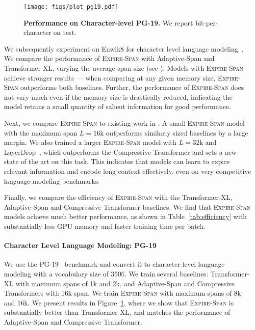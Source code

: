 \begin{figure}
    \centering
    \texttt{[image: figs/plot\_pg19.pdf]}
    \caption{\textbf{Performance on Character-level PG-19.}  We report bit-per-character on test.}
    \label{fig:pg19}
\end{figure}

We subsequently experiment on Enwik8 for character level language modeling~\citep{mahoney2011large}.  
We compare the performance of \textsc{Expire-Span} with Adaptive-Span and Transformer-XL, varying the average span size (see ). Models with \textsc{Expire-Span} achieve stronger results --- when comparing at any given memory size, \textsc{Expire-Span} outperforms both baselines. Further, the performance of \textsc{Expire-Span} does not vary much even if the memory size is drastically reduced, indicating the model retains a small quantity of salient information for good performance.

Next, we compare \textsc{Expire-Span} to existing work in . A small \textsc{Expire-Span} model with the maximum span $L=16\text{k}$ outperforms similarly sized baselines by a large margin.
We also trained a larger \textsc{Expire-Span} model with $L=32\text{k}$ and LayerDrop~\cite{Fan2020Reducing}, which outperforms the Compressive Transformer and sets a new state of the art on this task. 
This indicates that models can learn to expire relevant information and encode long context effectively, even on very competitive language modeling benchmarks.

Finally, we compare the efficiency of \textsc{Expire-Span} with the Transformer-XL, Adaptive-Span and Compressive Transformer baselines. 
We find that \textsc{Expire-Span} models achieve much better performance, as shown in Table~\ref{tab:efficiency} with substantially less GPU memory and faster training time per batch. 


\paragraph{Character Level Language Modeling: PG-19} 

We use the PG-19~\citep{rae2020compressive} benchmark and convert it to character-level language modeling with a vocabulary size of 3506.
We train several baselines: Transformer-XL with maximum spans of 1k and 2k, and Adaptive-Span and Compressive Transformers with 16k span.
We train \textsc{Expire-Span} with maximum spans of 8k and 16k.
We present results in Figure~\ref{fig:pg19}, where we show that  \textsc{Expire-Span} is substantially better than Transformer-XL, and matches the performance of Adaptive-Span and Compressive Transformer.

